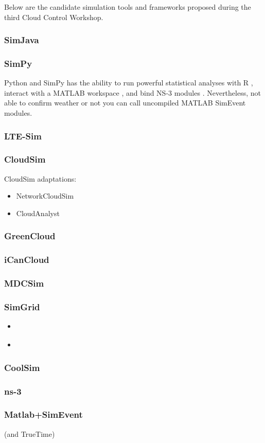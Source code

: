 Below are the candidate simulation tools and frameworks proposed during the third Cloud Control Workshop. \cite{zhao2012modeling}

\subsubsection{SimJava}

\subsubsection{SimPy}
Python and SimPy has the ability to run powerful statistical analyses with R \cite{rproject}, interact with a MATLAB workspace \cite{pymatlab}, and bind NS-3 modules \cite{ns3python}. Nevertheless, not able to confirm weather or not you can call uncompiled MATLAB SimEvent modules.

\subsubsection{LTE-Sim}
\cite{5634134}

\subsubsection{CloudSim} \cite{cloudsim}

CloudSim adaptations:
\begin{itemize}
\item NetworkCloudSim \cite{6123487}
\item CloudAnalyst \cite{wickremasinghe2010cloudanalyst}
\end{itemize}

\subsubsection{GreenCloud}
\cite{greencloud}

\subsubsection{iCanCloud}
\cite{icancloud}

\subsubsection{MDCSim}
\cite{5289159}

\subsubsection{SimGrid} 
\cite{simgrid}

\begin{itemize}
\item \cite{4488918}
\item \cite{bobelin2012scalable}
\end{itemize}

\subsubsection{CoolSim}
\cite{coolsim}

\subsubsection{ns-3}
\cite{ns3}

\subsubsection{Matlab+SimEvent} (and TrueTime)